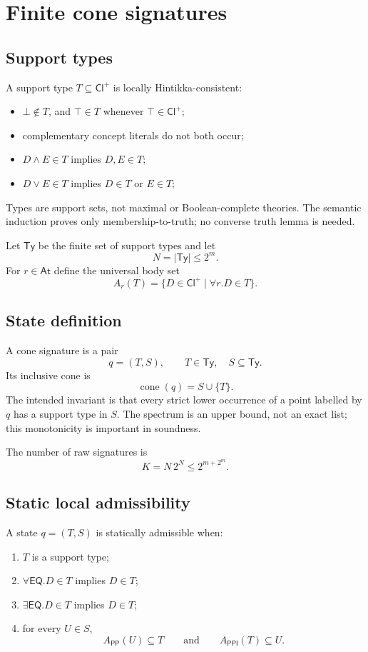 \documentclass[11pt]{article}
\newcommand{\PP}{\mathsf{PP}}
\newcommand{\PPI}{\mathsf{PPI}}
\newcommand{\EQ}{\mathsf{EQ}}
\newcommand{\Ty}{\mathsf{Ty}}
\newcommand{\Cl}{\mathsf{Cl}^{+}}
\newcommand{\cone}{\operatorname{cone}}
\newcommand{\At}{\mathsf{At}}
\begin{document}
\section{Finite cone signatures}

\subsection{Support types}

A support type $T\subseteq\Cl$ is locally Hintikka-consistent:

\begin{itemize}
  \item $\bot\notin T$, and $\top\in T$ whenever $\top\in\Cl$;
  \item complementary concept literals do not both occur;
  \item $D\wedge E\in T$ implies $D,E\in T$;
  \item $D\vee E\in T$ implies $D\in T$ or $E\in T$;
\end{itemize}

Types are support sets, not maximal or Boolean-complete theories. The semantic induction
proves only membership-to-truth; no converse truth lemma is needed.

Let $\Ty$ be the finite set of support types and let
\[
  N=|\Ty|\leq 2^m.
\]
For $r\in\At$ define the universal body set
\[
  A_r(T)=\{D\in\Cl\mid \forall r.D\in T\}.
\]

\subsection{State definition}

A cone signature is a pair
\[
  q=(T,S),\qquad T\in\Ty,\quad S\subseteq\Ty.
\]
Its inclusive cone is
\[
  \cone(q)=S\cup\{T\}.
\]
The intended invariant is that every strict lower occurrence of a point labelled by $q$
has a support type in $S$. The spectrum is an upper bound, not an exact list; this
monotonicity is important in soundness.

The number of raw signatures is
\[
  K=N\,2^N\leq 2^{m+2^m}.
\]

\subsection{Static local admissibility}

A state $q=(T,S)$ is statically admissible when:

\begin{enumerate}
  \item $T$ is a support type;
  \item $\forall\EQ.D\in T$ implies $D\in T$;
  \item $\exists\EQ.D\in T$ implies $D\in T$;
  \item for every $U\in S$,
  \[
    A_{\PP}(U)\subseteq T
    \qquad\text{and}\qquad
    A_{\PPI}(T)\subseteq U.
  \]
\end{enumerate}
\end{document}
